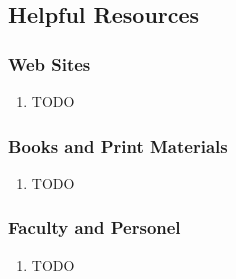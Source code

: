 \subsection{Helpful Resources}
\subsubsection{Web Sites}
\begin{enumerate}
\item{TODO}
\end{enumerate}

\subsubsection{Books and Print Materials}
\begin{enumerate}
\item{TODO}
\end{enumerate}

\subsubsection{Faculty and Personel}
\begin{enumerate}
\item{TODO}
\end{enumerate}
